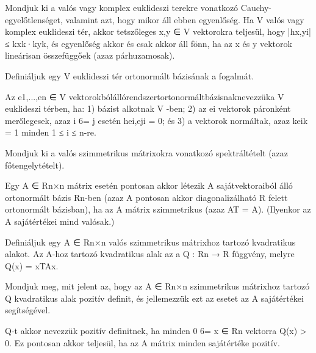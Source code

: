 \begin{frame}
  \begin{tcolorbox}[title={42}]
    Mondjuk ki a valós vagy komplex euklideszi terekre vonatkozó Cauchy-egyelőtlenséget, valamint azt, hogy mikor áll ebben egyenlőség.
  \tcblower
Ha V valós vagy komplex euklideszi tér, akkor tetszőleges x,y ∈ V vektorokra teljesül, hogy |hx,yi| ≤ kxk·kyk, és egyenlőség akkor és csak akkor áll fönn, ha az x és y vektorok lineárisan összefüggőek (azaz párhuzamosak).

  \end{tcolorbox}
\end{frame}


\begin{frame}
  \begin{tcolorbox}[title={43}]
    Deﬁniáljuk egy V euklideszi tér ortonormált bázisának a fogalmát.

  \tcblower
Az e1,...,en ∈ V vektorokbólállórendszertortonormáltbázisnaknevezzüka V euklideszi térben, ha: 1) bázist alkotnak V -ben; 2) az ei vektorok páronként merőlegesek, azaz i 6= j esetén hei,eji = 0; és 3) a vektorok normáltak, azaz keik = 1 minden 1 ≤ i ≤ n-re. 
  \end{tcolorbox}
\end{frame}


\begin{frame}
  \begin{tcolorbox}[title={44}]
    Mondjuk ki a valós szimmetrikus mátrixokra vonatkozó spektráltételt (azaz főtengelytételt).

  \tcblower
Egy A ∈ Rn×n mátrix esetén pontosan akkor létezik A sajátvektoraiból álló ortonormált bázis Rn-ben (azaz A pontosan akkor diagonalizálható R felett ortonormált bázisban), ha az A mátrix szimmetrikus (azaz AT = A). (Ilyenkor az A sajátértékei mind valósak.)

  \end{tcolorbox}
\end{frame}


\begin{frame}
  \begin{tcolorbox}[title={45}]
    Deﬁniáljuk egy A ∈ Rn×n valós szimmetrikus mátrixhoz tartozó kvadratikus alakot.
  \tcblower
Az A-hoz tartozó kvadratikus alak az a Q : Rn → R függvény, melyre Q(x) = xTAx.
  \end{tcolorbox}
\end{frame}

\begin{frame}
  \begin{tcolorbox}[title={46}]
     Mondjuk meg, mit jelent az, hogy az A ∈ Rn×n szimmetrikus mátrixhoz tartozó Q kvadratikus alak pozitív deﬁnit, és jellemezzük ezt az esetet az A sajátértékei segítségével.

  \tcblower
Q-t akkor nevezzük pozitív deﬁnitnek, ha minden 0 6= x ∈ Rn vektorra Q(x) > 0. Ez pontosan akkor teljesül, ha az A mátrix minden sajátértéke pozitív.
  \end{tcolorbox}
\end{frame}


